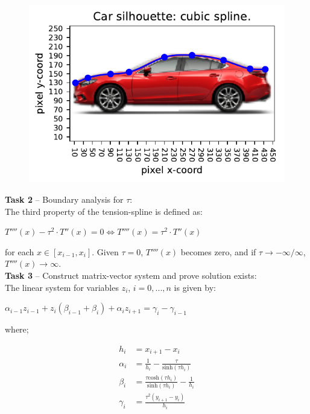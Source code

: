 \documentclass{article}
\newcommand{\T}[2]{\textbf{Task #1} -- #2:\\}
\begin{document}
\begin{figure}[!ht]
  \center
  \includegraphics{figs/p2-car-grid-cubic.pdf}
\end{figure}



\T{2}{Boundary analysis for $\tau$}

  The third property of the tension-spline is defined as:

  \begin{center}
  $
    T''''(x) - \tau^2 \cdot T''(x) = 0 \iff
    T''''(x) = \tau^2 \cdot T''(x)
  $
  \end{center}

  for each $ x \in [x_{i-1},x_i]$. Given $ \tau = 0 $, $T''''(x)$ becomes zero,
  and if $\tau \rightarrow -\infty/\infty$, $T''''(x) \rightarrow \infty$. \\

\T{3}{Construct matrix-vector system and prove solution exists}

  The linear system for variables $z_i$, $i = 0,...,n$ is given by:
  \begin{center}
    $\alpha_{i-1}z_{i-1} + z_i(\beta_{i-1} + \beta_i) + \alpha_i z_{i+1} =
    \gamma_i - \gamma_{i-1}$
  \end{center}

  where;

  \begin{align*}
    h_i &= x_{i+1} - x_i \\
    \alpha_i &= \frac{1}{h_i} - \frac{\tau}{\mathrm{sinh}(\tau h_i)} \\
    \beta_i &= \frac{\tau \mathrm{cosh}(\tau h_i)}{\mathrm{sinh}(\tau h_i)} -
    \frac{1}{h_i} \\
    \gamma_i &= \frac{\tau^2(y_{i+1}-y_i)}{h_i}
  \end{align*}
\end{document}
